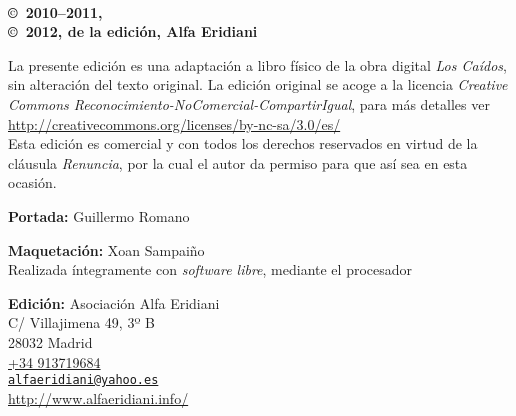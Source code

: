 \noindent
\textbf{\titlename}\\
\authorname

\footnotesize

\bigskip\bigskip\noindent
\textbf{\copyright\ 2010--2011, \authorname}\\
\textbf{\copyright\ 2012, de la edición, Alfa Eridiani}\\
\raggedright La presente edición es una adaptación a libro físico de la obra digital \emph{Los Caídos}, sin alteración del texto original. La edición original se acoge a la licencia \emph{Creative Commons Reconocimiento-NoComercial-CompartirIgual}, para más detalles ver \url{http://creativecommons.org/licenses/by-nc-sa/3.0/es/}\\
Esta edición es comercial y con todos los derechos reservados en virtud de la cláusula \emph{Renuncia}, por la cual el autor da permiso para que así sea en esta ocasión.

\footnotesize

\bigskip\noindent
\textbf{Portada:} Guillermo Romano

\smallskip\noindent
\textbf{Maquetación:} Xoan Sampaiño\\
Realizada íntegramente con \emph{software libre}, mediante el procesador \LaTeXe

\bigskip\noindent
\textbf{Edición:} Asociación Alfa Eridiani\\
C/ Villajimena 49, 3º B\\
28032 Madrid\\
\href{tel:+34913719684}{+34 913719684}\\
\href{mailto:alfaeridiani@yahoo.es}{\nolinkurl{alfaeridiani@yahoo.es}}\\
\url{http://www.alfaeridiani.info/}

\normalsize

\endinput
